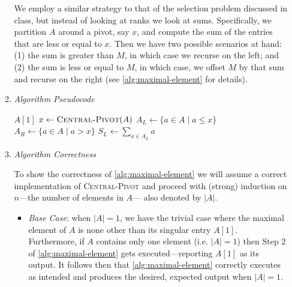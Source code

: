 \documentclass{article}
\begin{document}
\begin{enumerate}[leftmargin={*}, font={\bf}, label={\arabic*.}, ref={\arabic*}]
\begin{enumerate}
        We employ a similar strategy to that of the selection problem discussed in class, but instead
        of looking at ranks we look at sums. Specifically, we partition $A$ around a pivot, say $x$,
        and compute the sum of the entries that are less or equal to $x$. Then we have two possible
        scenarios at hand: (1) the sum is greater than $M$, in which case we recurse on the left; and
        (2) the sum is less or equal to $M$, in which case, we offset $M$ by that sum and recurse on
        the right (see \autoref{alg:maximal-element} for details).

      \item
        {\itshape Algorithm Pseudocode} \vspace{-\baselineskip}

        \begin{minipage}{\linewidth}
          \begin{algorithm}[H]
            \caption{$\textsc{Maximal-Element}(A, M)$}\label{alg:maximal-element}
            \begin{algorithmic}[1]
                \State \Return $A[1]$
              \EndIf
              \State
              \State $x \gets \Call{Central-Pivot}{A}$
              \State $A_L \gets \{a \in A \mid a \leq x\}$
              \State $A_R \gets \{a \in A \mid a > x\}$
              \State $S_L \gets \sum_{a \in A_L} a$
              \State
                \State \Return {}
              \Else
                \State \Return {}
              \EndIf
            \end{algorithmic}
          \end{algorithm}
        \end{minipage}

      \item
        {\itshape Algorithm Correctness}

        To show the correctness of \autoref{alg:maximal-element} we will assume a correct implementation of
        \textsc{Central-Pivot} and proceed with (strong) induction on $n$---the number of elements in $A$---
        also denoted by $|A|$.

        \begin{itemize}[itemsep=0pt]
          \item
            {\itshape Base Case}: when $|A| = 1$, we have the trivial case where the maximal element of
            $A$ is none other than its singular entry $A[1]$. Furthermore, if $A$ contains only one element
            (i.e. $|A| = 1$) then Step $2$ of \autoref{alg:maximal-element} gets executed---reporting $A[1]$
            as its output. It follows then that \autoref{alg:maximal-element} correctly executes as intended
            and produces the desired, expected output when $|A| = 1$.


\end{itemize}
\end{enumerate}
\end{enumerate}
\end{document}
